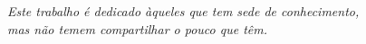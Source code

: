 \begin{dedicatoria}
   \vspace*{\fill}
   \centering
   \noindent

	\textit{Este trabalho é dedicado àqueles que tem sede de conhecimento,\\ mas não temem compartilhar o pouco que têm.}

\vspace*{\fill}
\end{dedicatoria}
